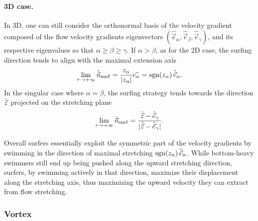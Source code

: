 \paragraph{3D case.}
In 3D, one can still consider the orthonormal basis of the velocity gradient composed of the flow velocity gradients eigenvectors $(\hat{\vec{e}}_{\alpha}, \hat{\vec{e}}_{\beta}, \hat{\vec{e}}_{\gamma})$, and its respective eigenvalues so that $\alpha \ge \beta \ge \gamma$.
If $\alpha > \beta$, as for the 2D case, the surfing direction tends to align with the maximal extension axis
\begin{equation}
	\label{eq:optimal_swimming_direction_sym_lim}
	\lim_{\tau \to +\infty} \hat{\vec{n}}_{\mathrm{surf}} = \frac{z_{\alpha}}{\lvert z_{\alpha}\rvert} \vec{e_{\alpha}} = \operatorname{sgn}(z_{\alpha}) \, \hat{\vec{e}}_{\alpha}.
\end{equation}
In the singular case where $\alpha = \beta$, the surfing strategy tends towards the direction $\hat{\vec{z}}$ projected on the stretching plane
\begin{equation}
	\label{eq:optimal_swimming_direction_sym_lim_3D}
	\lim_{\tau \to +\infty} \hat{\vec{n}}_{\mathrm{surf}} = \frac{\hat{\vec{z}} - \hat{\vec{e}}_{\gamma}}{\lvert\hat{\vec{z}} - \hat{\vec{e}}_{\gamma}\rvert}.
\end{equation}

Overall surfers essentially exploit the symmetric part of the velocity gradients by swimming in the direction of maximal stretching $\operatorname{sgn}(z_{\alpha}) \, \hat{\vec{e}}_{\alpha}$.
While bottom-heavy swimmers still end up being pushed along the upward stretching direction, surfers, by swimming actively in that direction, maximize their displacement along the stretching axis, thus maximizing the upward velocity they can extract from flow stretching. 

\subsubsection{Vortex}\label{sec:the_surfing_strategy_linear_skew_sym}

